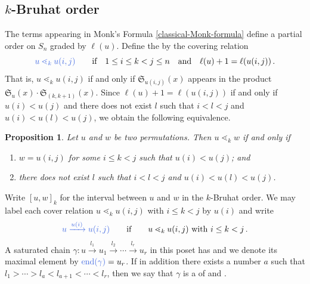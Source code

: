 \documentclass[12pt,oneside,reqno]{amsart}
\newtheorem{proposition}[theorem]{Proposition}
\theoremstyle{definition}
\numberwithin{equation}{section}
\newcommand{\frakS}{{\mathfrak S}}
\DeclareMathOperator{\nd}{end}
\newcommand{\defcolor}[1]{{\color{RoyalBlue}#1}}
\newcommand{\demph}[1]{\defcolor{{\sl #1}}}
\begin{document}
\subsection{$k$-Bruhat order}

The terms appearing in Monk's Formula \eqref{classical-Monk-formula}
define a partial order on $S_n$ graded by $\ell(u)$.
Define the \demph{$k$-Bruhat order $\leq_k$} by the covering relation
\[
    {\defcolor{u\lessdot_k u (i,j)}}
    \qquad\text{if}\quad
    1 \leq i\leq k<j \leq n
    \quad\text{and}\quad
    \ell(u)+1=\ell(u(i,j))\,.
\]
That is, $u\lessdot_k u (i,j)$ if and only if $\frakS_{u(i,j)}(x)$ appears in the product
$\frakS_{u}(x) \cdot \frakS_{(k,k+1)}(x)$.
Since $\ell(u)+1=\ell(u (i,j))$ if and only if $u(i)<u(j)$ and there does not
exist $l$ such that $i < l < j$ and $u(i) < u(l) < u(j)$, we obtain the
following equivalence.

\begin{proposition}
    \label{nothing-in-between-is-in-between}
    Let $u$ and $w$ be two permutations.
    Then $u \lessdot_k w$ if and only if
    \begin{enumerate} %
        \item
            $w = u(i, j)$ for some $i \leq k < j$ such that $u(i) < u(j)$;
            and

        \item
            there does not exist $l$ such that
            $i < l < j$ and $u(i) < u(l) < u(j)$.
    \end{enumerate}
\end{proposition}

Write \defcolor{$[u,w]_k$} for the interval between $u$ and $w$ in the
$k$-Bruhat order.
We may label each cover relation $u\lessdot_k u(i,j)$ with $i\leq k<j$ by $u(i)$ and write
\begin{equation*}
    \defcolor{u \xrightarrow{u(i)} u(i,j)}
    \qquad \text{if} \qquad
    u \lessdot_k u(i,j)\ \mbox{with}\ i\leq k<j\,.
\end{equation*}
%
A saturated chain 
$\gamma\colon u\xrightarrow{l_1}u_1\xrightarrow{l_2}\dotsb\xrightarrow{l_r}u_r$
in this poset has \demph{length~$r$}
and we denote its maximal element by $\defcolor{\nd(\gamma)} = u_r$.
If in addition there exists a number $a$ such that $l_1>\dotsb >l_a<l_{a+1}<\dotsb<l_{r}$, then we say that $\gamma$ is
a \demph{peakless chain} of \demph{height $a$} and \demph{length $r$}.
\end{document}

